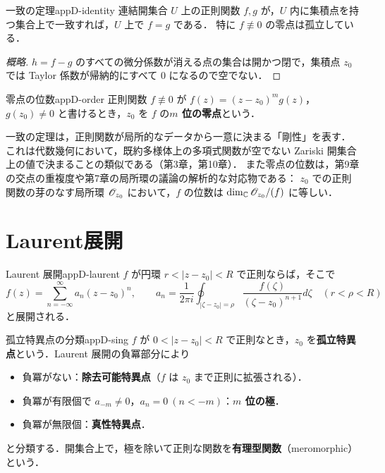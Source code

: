 \begin{mythm}{一致の定理}{appD-identity}
連結開集合 $U$ 上の正則関数 $f,g$ が，$U$ 内に集積点を持つ集合上で一致すれば，$U$ 上で $f=g$ である．
特に $f\not\equiv0$ の零点は孤立している．
\end{mythm}
\begin{proof}[概略]
$h=f-g$ のすべての微分係数が消える点の集合は開かつ閉で，集積点 $z_0$ では Taylor 係数が帰納的にすべて $0$ になるので空でない．
\end{proof}

\begin{mydef}{零点の位数}{appD-order}
正則関数 $f\not\equiv0$ が $f(z)=(z-z_0)^mg(z)$，$g(z_0)\ne0$ と書けるとき，$z_0$ を $f$ の\textbf{$m$ 位の零点}という．
\end{mydef}

一致の定理は，正則関数が局所的なデータから一意に決まる「剛性」を表す．
これは代数幾何において，既約多様体上の多項式関数が空でない Zariski 開集合上の値で決まることの類似である（第3章，第10章）．
また零点の位数は，第9章の交点の重複度や第7章の局所環の議論の解析的な対応物である：
$z_0$ での正則関数の芽のなす局所環 $\mathscr{O}_{z_0}$ において，$f$ の位数は $\dim_{\mathbb{C}}\mathscr{O}_{z_0}/(f)$ に等しい．

\section{Laurent展開}

\begin{mythm}{Laurent 展開}{appD-laurent}
$f$ が円環 $r<|z-z_0|<R$ で正則ならば，そこで
\[
f(z)=\sum_{n=-\infty}^{\infty}a_n(z-z_0)^n,\qquad
a_n=\frac1{2\pi i}\oint_{|\zeta-z_0|=\rho}\frac{f(\zeta)}{(\zeta-z_0)^{n+1}}d\zeta\quad(r<\rho<R)
\]
と展開される．
\end{mythm}

\begin{mydef}{孤立特異点の分類}{appD-sing}
$f$ が $0<|z-z_0|<R$ で正則なとき，$z_0$ を\textbf{孤立特異点}という．Laurent 展開の負冪部分により
\begin{itemize}
\item 負冪がない：\textbf{除去可能特異点}（$f$ は $z_0$ まで正則に拡張される）．
\item 負冪が有限個で $a_{-m}\ne0$，$a_{n}=0\ (n<-m)$：\textbf{$m$ 位の極}．
\item 負冪が無限個：\textbf{真性特異点}．
\end{itemize}
と分類する．開集合上で，極を除いて正則な関数を\textbf{有理型関数}（meromorphic）という．
\end{mydef}

